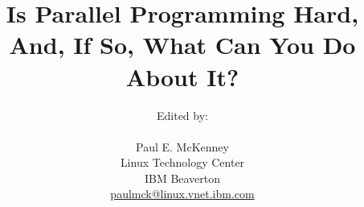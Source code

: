 \documentclass[10pt,twocolumn]{book}
\begin{document}
\newcommand{\co}[1]{\lstinline[breaklines=yes,breakatwhitespace=yes]{#1}}

\title{Is Parallel Programming Hard, And, If So, What Can You Do About It?}
\author{
	Edited by: \\
	\\
	Paul E. McKenney \\
	Linux Technology Center \\
	IBM Beaverton \\
	\href{mailto:paulmck@linux.vnet.ibm.com}{paulmck@linux.vnet.ibm.com} \\
} %

\setcounter{topnumber}{3}
\renewcommand\topfraction{.75}
\setcounter{bottomnumber}{2}
\renewcommand\bottomfraction{.3}
\setcounter{totalnumber}{5}
\renewcommand\textfraction{.15}
\renewcommand\floatpagefraction{.5}
\setcounter{dbltopnumber}{3}
\renewcommand\dbltopfraction{.75}
\renewcommand\dblfloatpagefraction{.5}

\setlength{\textheight}{8.25in}
\setlength{\textwidth}{6.5in}
\setlength{\columnsep}{0.25in}

\newcommand{\IfInBook}[2]{\ifthenelse{\boolean{inbook}}{#1}{#2}}
\setcounter{secnumdepth}{3}

\frontmatter

\maketitle

\tableofcontents


\mainmatter

















\appendix



\end{document}
